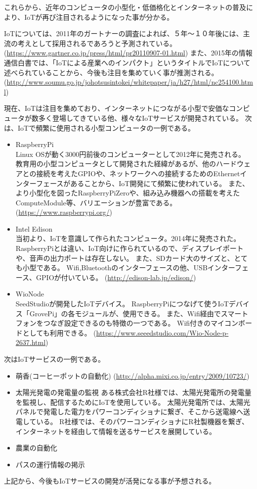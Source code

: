 これらから、近年のコンピュータの小型化・低価格化とインターネットの普及により、IoTが再び注目されるようになった事が分かる。


IoTについては、2011年のガートナーの調査によれば、５年〜１０年後には、主流の考えとして採用されるであろうと予測されている。
(\url{https://www.gartner.co.jp/press/html/pr20110907-01.html})
また、2015年の情報通信白書では、「IoTによる産業へのインパクト」というタイトルでIoTについて述べられていることから、今後も注目を集めていく事が推測される。
(\url{http://www.soumu.go.jp/johotsusintokei/whitepaper/ja/h27/html/nc254100.html})

現在、IoTは注目を集めており、インターネットにつながる小型で安価なコンピュータが数多く登場してきている他、様々なIoTサービスが開発されている。
次は、IoTで頻繁に使用される小型コンピュータの一例である。
\begin{itemize}
\item RaspberryPi\\
	Linux OSが動く3000円前後のコンピューターとして2012年に発売される。
	教育用の小型コンピュータとして開発された経緯があるが、他のハードウェアとの接続を考えたGPIOや、ネットワークへの接続するためのEthernetインターフェースがあることから、IoT開発にて頻繁に使われている。
	また、より小型化を図ったRaspberryPiZeroや、組み込み機器への搭載を考えたComputeModule等、バリエーションが豊富である。
	(\url{https://www.raspberrypi.org/})
\item Intel Edison\\
	当初より、IoTを意識して作られたコンピュータ。2014年に発売された。
	RaspberryPiとは違い、IoT向けに作られているので、ディスプレイポートや、音声の出力ポートは存在しない。
	また、SDカード大のサイズと、とても小型である。
	Wifi,Bluetoothのインターフェースの他、USBインターフェース、GPIOが付いている。
	(\url{http://edison-lab.jp/edison/})
\item WioNode\\
	SeedStudioが開発したIoTデバイス。
	RaspberryPiにつなげて使うIoTデバイス「GrovePi」の各モジュールが、使用できる。
	また、Wifi経由でスマートフォンをつなぎ設定できるのも特徴の一つである。
	Wifi付きのマイコンボードとしても利用できる。
	(\url{https://www.seeedstudio.com/Wio-Node-p-2637.html})
\end{itemize}

次はIoTサービスの一例である。
\begin{itemize}
\item 萌香(コーヒーポットの自動化)
	(\url{http://alpha.mixi.co.jp/entry/2009/10723/})
\item 太陽光発電の発電量の監視
	ある株式会社R社様では、太陽光発電所の発電量を監視し、配信するためにIoTを使用している。
	太陽光発電所では、太陽光パネルで発電した電力をパワーコンディショナに繋ぎ、そこから送電線へ送電している。
	R社様では、そのパワーコンディショナにR社製機器を繋ぎ、インターネットを経由して情報を送るサービスを展開している。
\item 農業の自動化
	
\item パスの運行情報の掲示

\end{itemize}
上記から、今後もIoTサービスの開発が活発になる事が予想される。

